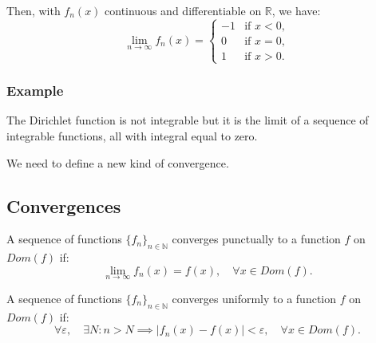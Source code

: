 \documentclass[11pt]{article}
\begin{document}
Then, with $f_n(x)$ continuous and differentiable on $\mathbb{R}$, we have:
\[\lim_{n \to \infty} f_n(x) = \begin{cases} -1 & \text{if } x < 0, \\ 0 & \text{if } x = 0, \\ 1 & \text{if } x > 0. \end{cases}\]
\begin{center}
\end{center}

\subsubsection*{Example}
The Dirichlet function is not integrable but it is the limit of a sequence of integrable functions, all with integral equal to zero.

We need to define a new kind of convergence.

\subsection{Convergences}
A sequence of functions \(\{f_n\}_{n \in \mathbb{N}}\) converges punctually to a function \(f\) on \(Dom(f)\) if:
\[\lim_{n \to \infty} f_n(x) = f(x), \quad \forall x \in Dom(f).\]

A sequence of functions \(\{f_n\}_{n \in \mathbb{N}}\) converges uniformly to a function \(f\) on \(Dom(f)\) if:
\[\forall \varepsilon, \quad \exists N : n > N \implies |f_n(x) - f(x)| < \varepsilon, \quad \forall x \in Dom(f).\]
\end{document}
